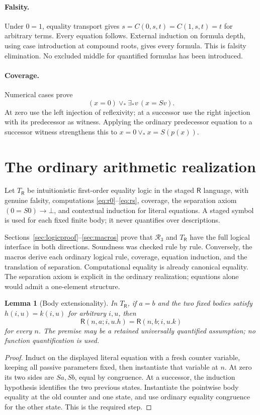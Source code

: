 \documentclass[11pt]{article}
\newtheorem{lemma}[theorem]{Lemma}
\theoremstyle{definition}
\theoremstyle{remark}
\newcommand{\R}{\mathsf R}
\newcommand{\K}{\mathcal R_3}
\begin{document}
\paragraph{Falsity.}
Under $0=1$, equality transport gives
$s=C(0,s,t)=C(1,s,t)=t$ for arbitrary terms.
Every equation follows. External induction on
formula depth, using case introduction at
compound roots, gives every formula. This is
falsity elimination. No excluded middle for
quantified formulas has been introduced.

\paragraph{Coverage.}
Numerical cases prove
\[
 (x=0)\vee_*\exists_*v\,(x=Sv).
\]
At zero use the left injection of reflexivity;
at a successor use the right injection with its
predecessor as witness.
Applying the ordinary predecessor equation to a
successor witness strengthens this to
$x=0\vee_*x=S(p(x))$.

\section{The ordinary arithmetic realization}
\label{sec:ordinary}

Let $T_{\R}$ be intuitionistic first-order equality
logic in the staged $\R$ language, with genuine
falsity, computations \eqref{eq:r0}--\eqref{eq:rs},
coverage, the separation axiom
$(0=S0)\to\bot$, and contextual induction for
literal equations. A staged symbol is used for
each fixed finite body; it never quantifies over
descriptions.

Sections~\ref{sec:logicproof}--\ref{sec:macros}
prove that $\K$ and $T_{\R}$ have the full logical
interface in both directions. Soundness was
checked rule by rule. Conversely, the macros
derive each ordinary logical rule, coverage,
equation induction, and the translation of
separation. Computational equality is already
canonical equality. The separation axiom is
explicit in the ordinary realization; equations
alone would admit a one-element structure.

\begin{lemma}[Body extensionality]
\label{lem:bodyext}
In $T_{\R}$, if $a=b$ and the two fixed bodies satisfy
$h(i,u)=k(i,u)$ for arbitrary $i,u$, then
\[
 \R(n,a;i,u.h)=\R(n,b;i,u.k)
\]
for every $n$. The premise may be a retained universally
quantified assumption; no function quantification is used.
\end{lemma}
\begin{proof}
Induct on the displayed literal equation with a fresh
counter variable, keeping all passive parameters fixed,
then instantiate that variable at $n$. At zero its
two sides are $Sa,Sb$, equal by congruence. At a
successor, the induction hypothesis identifies the
two previous states. Instantiate the pointwise
body equality at the old counter and one state,
and use ordinary equality congruence for the
other state. This is the required step.
\end{proof}
\end{document}
